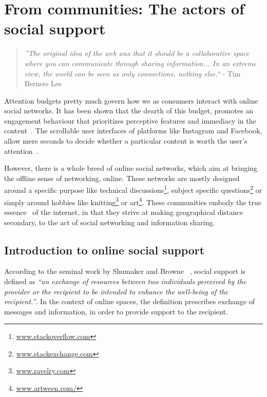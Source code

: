 
\chapter{From communities: The actors of social support }

\label{chap:Utility_support}
\graphicspath{{Chapter2/plots/} {Chapter2/plots}}
\begin{quote}
    \textit{''The original idea of the web was that it should be a collaborative space where you can communicate through sharing information... In an extreme view, the world can be seen as only connections, nothing else.``} - Tim Berners Lee\cite{berners2001weaving} 
\end{quote}
Attention budgets pretty much govern how we as consumers interact with online social networks. It has been shown that the dearth of this budget, promotes an engagement behaviour that prioritizes perceptive features and immediacy in the content~\cite{joglekar2017like}. The scrollable user interfaces of platforms like Instagram and Facebook, allow mere seconds to decide whether a particular content is worth the user's attention~\cite{eikelboom2017irresistible}. 

However, there is a whole breed of online social networks, which aim at bringing the offline sense of networking, online. These networks are mostly designed around a specific purpose like technical discussions\footnote{\url{www.stackoverflow.com}}, subject specific questions\footnote{\url{www.stackexchange.com}} or simply around hobbies like knitting\footnote{\url{www.ravelry.com}} or art\footnote{\url{www.artween.com/}}. These communities embody the true essence~\cite{berners2001weaving} of the internet, in that they strive at making geographical distance secondary, to the act of social networking and information sharing.

\section{Introduction to online social support}

According to the seminal work by Shumaker and Browne ~\cite{shumaker1984toward}, social support is defined as \textsl{``an exchange of resources between two individuals perceived by the provider or the recipient to be intended to enhance the well-being of the recipient.''}. In the context of online spaces, the definition prescribes exchange of messages and information, in order to provide support to the recipient.  

